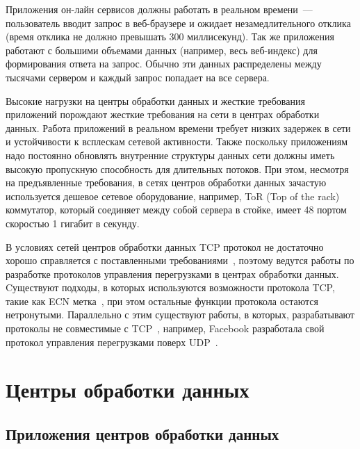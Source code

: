 \documentclass[14pt, a4paper,oneside]{extarticle}
\begin{document}
Приложения он-лайн сервисов должны работать в реальном времени~--- пользователь вводит запрос в веб-браузере и ожидает незамедлительного отклика (время отклика не должно превышать 300 миллисекунд). 
Так же приложения работают с большими объемами данных (например, весь веб-индекс) для формирования ответа на запрос. Обычно эти данных распределены между тысячами сервером и каждый запрос попадает на все сервера.

Высокие нагрузки на центры обработки данных и жесткие требования приложений порождают жесткие требования на сети в центрах обработки данных. Работа приложений в реальном времени требует низких задержек в сети и устойчивости к всплескам сетевой активности. Также поскольку приложениям надо постоянно обновлять внутренние структуры данных сети должны иметь высокую пропускную способность для длительных потоков. При этом, несмотря на предъявленные требования, в сетях центров обработки данных зачастую используется дешевое сетевое оборудование, например, ToR (Top of the rack) коммутатор, который соединяет между собой сервера в стойке, имеет 48 портом скоростью 1 гигабит в секунду.

В условиях сетей центров обработки данных TCP протокол не достаточно хорошо справляется с поставленными требованиями~\cite{dctcp}, поэтому ведутся работы по разработке протоколов управления перегрузками в центрах обработки данных.
Cуществуют подходы, в которых используются возможности протокола TCP, такие как ECN метка~\cite{dctp, d2tcp}, при этом остальные функции протокола остаются нетронутыми.
Параллельно с этим существуют работы, в которых, разрабатывают протоколы не совместимые с TCP~\cite{d3tcp}, например, Facebook разработала свой протокол управления перегрузками поверх UDP~\cite{facebook}.

\newpage

\section{Центры обработки данных}
\subsection{Приложения центров обработки данных}
\end{document}
